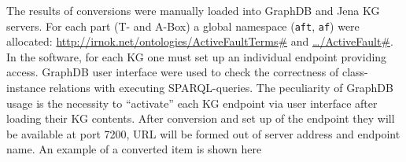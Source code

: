 \documentclass[
]{ceurart}
\begin{document}
The results of conversions were manually loaded into GraphDB and Jena KG servers.  For each part (T- and A-Box) a global namespace (\texttt{aft}, \texttt{af}) were allocated: \url{http://irnok.net/ontologies/ActiveFaultTerms\#} and \href{http://irnok.net/ontologies/ActiveFault\#}{\ldots/ActiveFault\#}.  In the software, for each KG one must set up an individual endpoint providing access.  GraphDB user interface were used to check the correctness of class-instance relations with executing SPARQL-queries.  The peculiarity of GraphDB usage is the necessity to ``activate'' each KG endpoint via user interface after loading their KG contents.  After conversion and set up of the endpoint they will be available at port 7200, URL will be formed out of server address and endpoint name.  An example of a converted item is shown here
\end{document}

